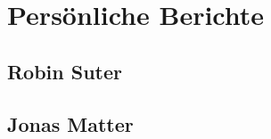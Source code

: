 
\section{Persönliche Berichte}
\label{Persönliche Berichte}

\subsection{Robin Suter}
\label{Persönliche Berichte:Robin Suter}



\subsection{Jonas Matter}
\label{Persönliche Berichte:Jonas Matter}

